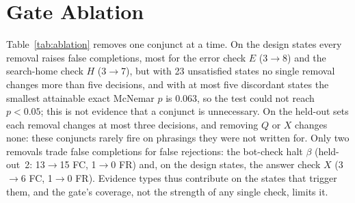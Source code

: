\section{Gate Ablation}
\label{sec:abl-full}



Table~\ref{tab:ablation} removes one conjunct at a time. On the design states every removal raises false completions, most for the error check $E$ (3$\to$8) and the search-home check $H$ (3$\to$7), but with 23 unsatisfied states no single removal changes more than five decisions, and with at most five discordant states the smallest attainable exact McNemar $p$ is 0.063, so the test could not reach $p<0.05$; this is not evidence that a conjunct is unnecessary. On the held-out sets each removal changes at most three decisions, and removing $Q$ or $X$ changes none: these conjuncts rarely fire on phrasings they were not written for. Only two removals trade false completions for false rejections: the bot-check halt $\beta$ (held-out~2: 13$\to$15 FC, 1$\to$0 FR) and, on the design states, the answer check $X$ (3$\to$6 FC, 1$\to$0 FR). Evidence types thus contribute on the states that trigger them, and the gate's coverage, not the strength of any single check, limits it.

